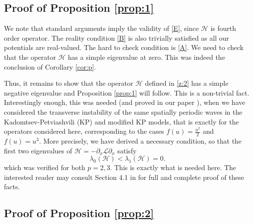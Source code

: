 \documentclass[final,11pt,leqno]{amsart}
\begin{document}
\subsection{Proof of Proposition \ref{prop:1}}
We note that standard arguments imply the validity of \eqref{E}, since ${\mathcal H}$ is fourth order operator. The reality condition \eqref{B} is also trivially satisfied as all our potentials are real-valued. The hard to check condition is \eqref{A}.
 We need to check that the operator ${\mathcal H}$ has a simple eigenvalue at zero. This was indeed the conclusion of Corollary \ref{cor:p}.

 Thus, it remains to show that the operator ${\mathcal H}$ defined in \eqref{z:2} has a simple negative eigenvalue and Proposition
 \ref{prop:1} will follow. This is a non-trivial fact. Interestingly enough, this   was needed (and proved in our paper \cite{HSS}), when we have considered  the transverse instability of the same spatially periodic waves in the Kadomtsev-Petviashvili (KP) and modified  KP models, that is exactly for the operators considered here, corresponding to the cases $f(u)={\frac{{u^2}}{{2}}}$ and $f(u)=u^3$.  More precisely, we have derived a necessary condition, so that the first two  eigenvalues of ${\mathcal H}=-{\partial}_x{\mathcal L}{\partial}_x$ satisfy
 $$
{\lambda}_0( {\mathcal H})< {\lambda}_1({\mathcal H}) =0.
 $$
 which was verified for both $p=2,3$. This is exactly what is needed here. The interested reader may consult Section 4.1 in \cite{HSS} for full and complete proof of these facts.

\subsection{Proof of Proposition \ref{prop:2}}
\end{document}

